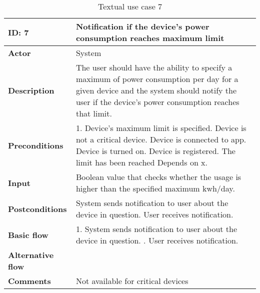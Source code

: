 \begin{table}[H]
\begin{tabular}{|l|p{11.7cm}|}
\hline
\textbf{ID: }7&\textbf{Notification if the device’s power consumption reaches maximum limit}
\\\hline
\textbf{Actor} &System
\\\hline
\textbf{Description}&
The user should have the ability to specify a maximum of power consumption per day for a given device and the system should notify the user if the device’s power consumption reaches that limit.\\\hline
\textbf{Preconditions}&
1. Device’s maximum limit is specified\newline
2. Device is not a critical device\newline
3. Device is connected to app\newline
4. Device is turned on\newline
5. Device is registered\newline
6. The limit has been reached\newline
Depends on x.\\\hline
\textbf{Input}&
Boolean value that checks whether the usage is higher than the specified maximum kwh/day.
\\\hline
\textbf{Postconditions}& 
System sends notification to user about the device in question. User receives notification.
\\\hline
\textbf{Basic flow}&
1. System sends notification to user about the device in question. \newline
2. User receives notification.\newline
\\\hline
\textbf{Alternative flow}&\\\hline
\textbf{Comments}& Not available for critical devices\\\hline
\end{tabular}
\caption{Textual use case 7}
\end{table}

